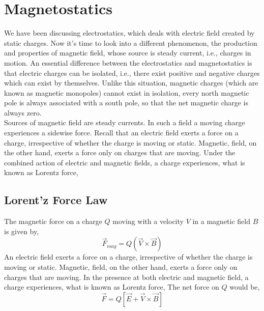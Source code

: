 \chapter{Magnetostatics}
We have been discussing electrostatics, which deals with electric field created by static charges. Now it's time to look into a different phenomenon, the production and properties of magnetic field, whose source is steady current, i.e., charges in motion. An essential difference between the electrostatics and magnetostatics is that electric charges can be isolated, i.e., there exist positive and negative charges which can exist by themselves. Unlike this situation, magnetic charges (which are known as magnetic monopoles) cannot exist in isolation, every north magnetic pole is always associated with a south pole, so that the net magnetic charge is always zero.\\
Sources of magnetic field are steady currents. In such a field a moving charge experiences a sidewise  force.  Recall that an electric field exerts a force on a charge, irrespective of whether the charge is  moving or static. Magnetic, field, on the other hand, exerts a force only on charges that are moving.  Under the combined action of electric and magnetic fields, a charge experiences, what is known as Lorentz force,
\section{Lorent'z Force Law}
The magnetic force on a charge $Q$ moving with a velocity $V$ in a magnetic field $B$ is given by,
\begin{equation}\label{Lorent'z Force Law 1}
\vec{F}_{mag}=Q(\vec{V}\times \vec{B})
\end{equation}
An electric field exerts a force on a charge, irrespective of whether the charge is
moving or static. Magnetic, field, on the other hand, exerts a force only on charges that are moving. In the presence at both electric and magnetic field, a charge experiences, what is known as Lorentz force,
The net force on $Q$ would be,
\begin{equation}\label{Lorent'z Force Law 2}
\vec{F}=Q[\vec{E}+\vec{V}\times \vec{B}]
\end{equation}
